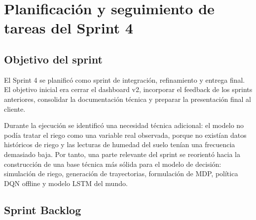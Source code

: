 \documentclass[11pt,a4paper]{article}
\begin{document}
\section{Planificación y seguimiento de tareas del Sprint 4}

\subsection{Objetivo del sprint}

El Sprint 4 se planificó como sprint de integración, refinamiento y entrega final. El objetivo inicial era cerrar el dashboard v2, incorporar el feedback de los sprints anteriores, consolidar la documentación técnica y preparar la presentación final al cliente.

Durante la ejecución se identificó una necesidad técnica adicional: el modelo no podía tratar el riego como una variable real observada, porque no existían datos históricos de riego y las lecturas de humedad del suelo tenían una frecuencia demasiado baja. Por tanto, una parte relevante del sprint se reorientó hacia la construcción de una base técnica más sólida para el modelo de decisión: simulación de riego, generación de trayectorias, formulación de MDP, política DQN offline y modelo LSTM del mundo.

\subsection{Sprint Backlog}
\end{document}
